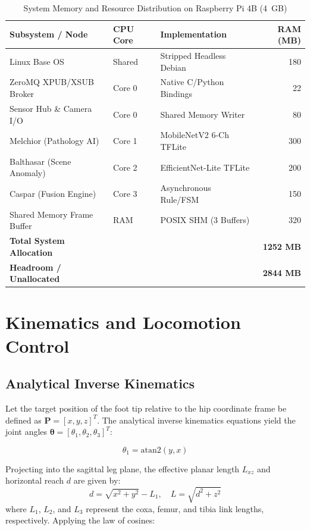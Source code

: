 \documentclass[conference]{IEEEtran}
\begin{document}
\begin{table}[t]
\caption{System Memory and Resource Distribution on Raspberry Pi 4B (4~GB)}
\label{tab:memory}
\centering
\begin{tabular}{@{}lllr@{}}
\toprule
\textbf{Subsystem / Node} & \textbf{CPU Core} & \textbf{Implementation} & \textbf{RAM (MB)} \\
\midrule
Linux Base OS & Shared & Stripped Headless Debian & 180 \\
ZeroMQ XPUB/XSUB Broker & Core 0 & Native C/Python Bindings & 22 \\
Sensor Hub \& Camera I/O & Core 0 & Shared Memory Writer & 80 \\
Melchior (Pathology AI) & Core 1 & MobileNetV2 6-Ch TFLite & 300 \\
Balthasar (Scene Anomaly) & Core 2 & EfficientNet-Lite TFLite & 200 \\
Caspar (Fusion Engine) & Core 3 & Asynchronous Rule/FSM & 150 \\
Shared Memory Frame Buffer & RAM & POSIX SHM (3 Buffers) & 320 \\
\midrule
\textbf{Total System Allocation} & & & \textbf{1252 MB} \\
\textbf{Headroom / Unallocated} & & & \textbf{2844 MB} \\
\bottomrule
\end{tabular}
\end{table}

\section{Kinematics and Locomotion Control}

\subsection{Analytical Inverse Kinematics}
Let the target position of the foot tip relative to the hip coordinate frame be defined as $\mathbf{P} = [x, y, z]^T$. The analytical inverse kinematics equations yield the joint angles $\boldsymbol{\theta} = [\theta_1, \theta_2, \theta_3]^T$:

\begin{equation}
\theta_1 = \text{atan2}(y, x)
\end{equation}

Projecting into the sagittal leg plane, the effective planar length $L_{xz}$ and horizontal reach $d$ are given by:
\begin{equation}
d = \sqrt{x^2 + y^2} - L_1, \quad L = \sqrt{d^2 + z^2}
\end{equation}
where $L_1$, $L_2$, and $L_3$ represent the coxa, femur, and tibia link lengths, respectively. Applying the law of cosines:
\end{document}
